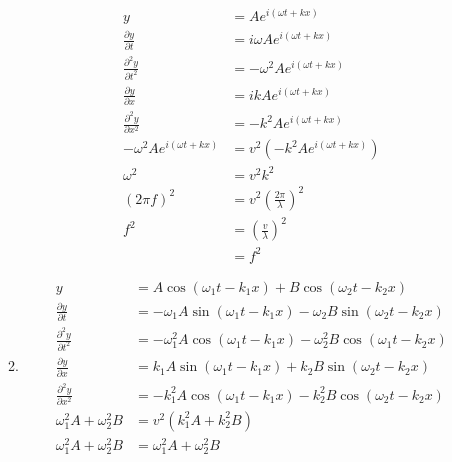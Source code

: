 \documentclass{article}
\begin{document}
\begin{enumerate}
\begin{enumerate}
                \begin{align*}
                  y                                  & = A e^{i (\omega t + k x)}                         \\
                  \frac{\partial y}{\partial t}      & = i \omega A e^{i (\omega t + k x)}                \\
                  \frac{\partial^2 y}{\partial t^2}  & = -\omega^2 A e^{i (\omega t + k x)}               \\
                  \frac{\partial y}{\partial x}      & = i k A e^{i (\omega t + k x)}                     \\
                  \frac{\partial^2 y}{\partial x^2}  & = -k^2 A e^{i (\omega t + k x)}                    \\
                  -\omega^2 A e^{i (\omega t + k x)} & = v^2 \left( -k^2 A e^{i (\omega t + k x)} \right) \\
                  \omega^2                           & = v^2 k^2                                          \\
                  (2 \pi f)^2                        & = v^2 \left( \frac{2 \pi}{\lambda} \right)^2       \\
                  f^2                                & = \left( \frac{v}{\lambda} \right)^2               \\
                                                     & = f^2
                \end{align*}

          \item

                \begin{align*}
                  y                                 & = A \cos (\omega_1 t - k_1 x) + B \cos (\omega_2 t - k_2 x)                        \\
                  \frac{\partial y}{\partial t}     & = -\omega_1 A \sin (\omega_1 t - k_1 x) - \omega_2 B \sin (\omega_2 t - k_2 x)     \\
                  \frac{\partial^2 y}{\partial t^2} & = -\omega_1^2 A \cos (\omega_1 t - k_1 x) - \omega_2^2 B \cos (\omega_1 t - k_2 x) \\
                  \frac{\partial y}{\partial x}     & = k_1 A \sin (\omega_1 t - k_1 x) + k_2 B \sin (\omega_2 t - k_2 x)                \\
                  \frac{\partial^2 y}{\partial x^2} & = -k_1^2 A \cos (\omega_1 t - k_1 x) - k_2^2 B \cos (\omega_2 t - k_2 x)           \\
                  \omega_1^2 A + \omega_2^2 B       & = v^2 \left( k_1^2 A + k_2^2 B \right)                                             \\
                  \omega_1^2 A + \omega_2 ^2 B      & = \omega_1^2 A + \omega_2^2 B
                \end{align*}
        \end{enumerate}


\end{enumerate}
\end{document}
